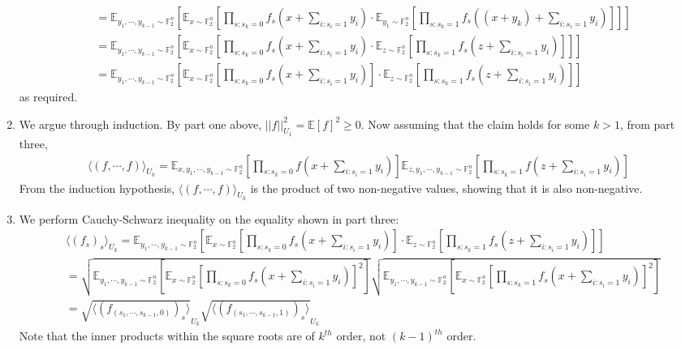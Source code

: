 \documentclass[12pt]{article}%
\newcommand{\Fn}{\mathbb{F}_2^n}
\newcommand{\Exp}[1]{\mathbb{E}_{#1}}
\begin{document}
\begin{enumerate}
\begin{align*}
    & =  \Exp{y_1, \cdots, y_{k-1} \sim \Fn} \left[ \Exp{x \sim \Fn} \left[ \prod_{s: s_k = 0} f_s(x + \sum_{i: s_i = 1} y_i) \cdot \Exp{y_1 \sim \Fn} \left[ \prod_{s: s_k = 1} f_s((x + y_k)+  \sum_{i: s_i = 1} y_i) \right] \right] \right] \\
    & = \Exp{y_1, \cdots, y_{k-1} \sim \Fn} \left[ \Exp{x \sim \Fn} \left[ \prod_{s: s_k = 0} f_s(x + \sum_{i: s_i = 1} y_i)  \cdot \Exp{z \sim \Fn} \left[ \prod_{s: s_k = 1} f_s(z +  \sum_{i: s_i = 1} y_i) \right] \right] \right] \\
    & = \Exp{y_1, \cdots, y_{k-1} \sim \Fn} \left[ \Exp{x \sim \Fn} \left[ \prod_{s: s_k = 0} f_s(x + \sum_{i: s_i = 1} y_i) \right] \cdot  \Exp{z \sim \Fn} \left[ \prod_{s: s_k = 1} f_s(z +  \sum_{i: s_i = 1} y_i) \right] \right]
  \end{align*}
  as required.

  \item We argue through induction. By part one above, $||f||_{U_1}^2 = \mathbb{E}[f]^2 \geq 0$. Now assuming that the claim holds for some $k > 1$, from part three,
  \begin{align*}
      \langle (f, \cdots, f) \rangle_{U_k} = \Exp{x, y_1, \cdots, y_{k-1} \sim \Fn} \left[ \prod_{s: s_k = 0} f(x + \sum_{i: s_i = 1} y_i) \right] \Exp{z, y_1, \cdots, y_{k-1} \sim \Fn} \left[ \prod_{s: s_k = 1} f(z +  \sum_{i: s_i = 1} y_i) \right]
  \end{align*}
  From the induction hypothesis, $\langle (f, \cdots, f) \rangle_{U_k}$ is the product of two non-negative values, showing that it is also non-negative.

  \item
  We perform Cauchy-Schwarz inequality on the equality shown in part three:
  \begin{align*}
    & \langle (f_s)_s \rangle_{U_k}  = \Exp{y_1, \cdots, y_{k-1} \sim \Fn} \left[ \Exp{x \sim \Fn} \left[ \prod_{s: s_k = 0} f_s(x + \sum_{i: s_i = 1} y_i) \right] \cdot  \Exp{z \sim \Fn} \left[ \prod_{s: s_k = 1} f_s(z +  \sum_{i: s_i = 1} y_i) \right] \right] \\
    & = \sqrt{\Exp{y_1, \cdots, y_{k-1} \sim \Fn} \left[ \Exp{x \sim \Fn} \left[ \prod_{s: s_k = 0} f_s(x + \sum_{i: s_i = 1} y_i) \right]^2 \right]} \sqrt{\Exp{y_1, \cdots, y_{k-1} \sim \Fn} \left[ \Exp{x \sim \Fn} \left[ \prod_{s: s_k = 1} f_s(x + \sum_{i: s_i = 1} y_i) \right]^2 \right]} \\
    & = \sqrt{ \langle(f_{(s_1,\cdots, s_{k-1}, 0)})_s\rangle}_{U_k}\sqrt{ \langle(f_{(s_1,\cdots, s_{k-1}, 1)})_s\rangle}_{U_k}
  \end{align*}
  Note that the inner products within the square roots are of $k^{th}$ order, not $(k-1)^{th}$ order.


\end{enumerate}
\end{document}
